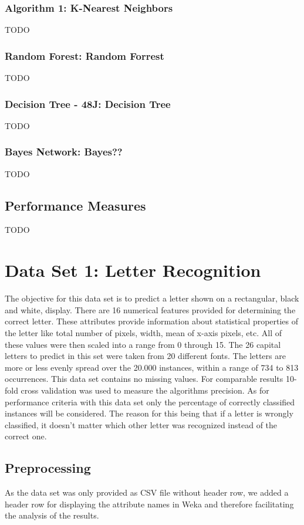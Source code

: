 \documentclass{sig-alternate-05-2015}
\begin{document}
\subsubsection{Algorithm 1: K-Nearest Neighbors}
TODO\\
\subsubsection{Random Forest: Random Forrest}
TODO\\
\subsubsection{Decision Tree - 48J: Decision Tree}
TODO\\
\subsubsection{Bayes Network: Bayes??}
TODO\\

\subsection{Performance Measures}
TODO\\

\section{Data Set 1: Letter Recognition}
The objective for this data set is to predict a letter shown on a rectangular, black and white, display. There are 16 numerical features  provided for determining the correct letter. These attributes provide information about statistical properties of the letter like total number of pixels, width, mean of x-axis pixels, etc.
All of these values were then scaled into a range from 0 through 15. The 26 capital letters to predict in this set were taken from 20 different fonts. The letters are more or less evenly spread over the 20.000 instances, within a range of 734 to 813 occurrences. This data set contains no missing values. For comparable results 10-fold cross validation was used to measure the algorithms precision.
As for performance criteria with this data set only the percentage of correctly classified instances will be considered. The reason for this being that if a letter is wrongly classified, it doesn't matter which other letter was recognized instead of the correct one. 
\\
\subsection{Preprocessing}
As the data set was only provided as CSV file without header row, we added a header row for displaying the attribute names in Weka and therefore facilitating the analysis of the results. 
\\
\end{document}
